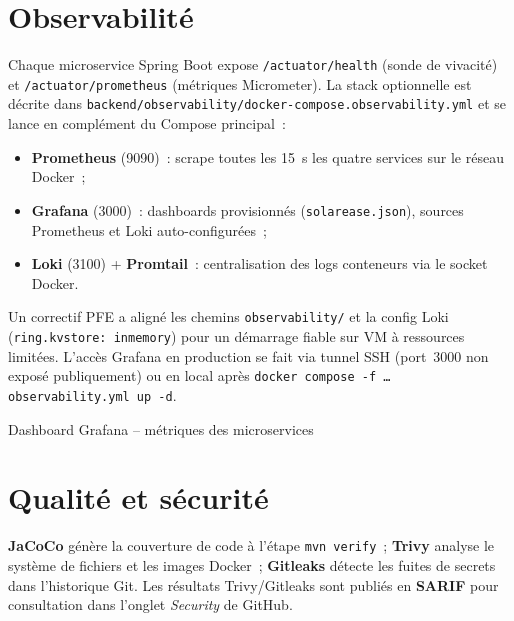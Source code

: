 
\section{Observabilité}

Chaque microservice Spring Boot expose \texttt{/actuator/health} (sonde de
vivacité) et \texttt{/actuator/prometheus} (métriques Micrometer). La stack
optionnelle est décrite dans
\texttt{backend/observability/docker-compose.observability.yml} et se lance
en complément du Compose principal~:

\begin{itemize}[leftmargin=*, nosep]
  \item \textbf{Prometheus} (9090)~: scrape toutes les 15~s les quatre
        services sur le réseau Docker~;
  \item \textbf{Grafana} (3000)~: dashboards provisionnés
        (\texttt{solarease.json}), sources Prometheus et Loki auto-configurées~;
  \item \textbf{Loki} (3100) + \textbf{Promtail}~: centralisation des logs
        conteneurs via le socket Docker.
\end{itemize}

Un correctif PFE a aligné les chemins \texttt{observability/} et la config
Loki (\texttt{ring.kvstore: inmemory}) pour un démarrage fiable sur VM à
ressources limitées. L'accès Grafana en production se fait via tunnel SSH
(port~3000 non exposé publiquement) ou en local après
\texttt{docker compose -f \ldots observability.yml up -d}.

{Dashboard Grafana -- métriques des microservices}

\section{Qualité et sécurité}

\textbf{JaCoCo} génère la couverture de code à l'étape \texttt{mvn verify}~;
\textbf{Trivy} analyse le système de fichiers et les images Docker~;
\textbf{Gitleaks} détecte les fuites de secrets dans l'historique Git.
Les résultats Trivy/Gitleaks sont publiés en \textbf{SARIF} pour consultation
dans l'onglet \textit{Security} de GitHub.

